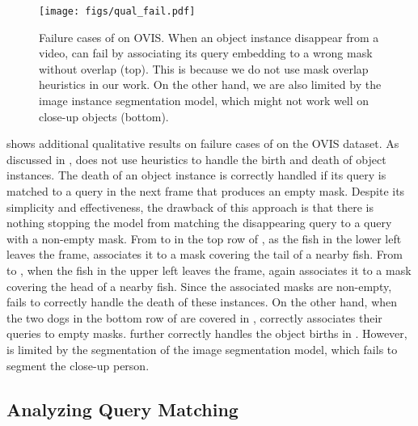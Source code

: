 \begin{figure}
  \centering
  \texttt{[image: figs/qual\_fail.pdf]}
  \caption{Failure cases of \ours on OVIS. When an object instance disappear from a video, \ours can fail by associating its query embedding to a wrong mask without overlap (top). This is because we do not use mask overlap heuristics in our work. On the other hand, we are also limited by the image instance segmentation model, which might not work well on close-up objects (bottom). }
  \label{fig:qual-fail}
\end{figure}


 shows additional qualitative results on failure cases of \ours on the OVIS dataset. As discussed in , \ours does not use heuristics to handle the birth and death of object instances. The death of an object instance is correctly handled if its query is matched to a query in the next frame that produces an empty mask. Despite its simplicity and effectiveness, the drawback of this approach is that there is nothing stopping the model from matching the disappearing query to a query with a non-empty mask. From  to  in the top row of , as the fish in the lower left leaves the frame, \ours associates it to a mask covering the tail of a nearby fish. From  to , when the fish in the upper left leaves the frame, \ours again associates it to a mask covering the head of a nearby fish. Since the associated masks are non-empty, \ours fails to correctly handle the death of these instances. On the other hand, when the two dogs in the bottom row of  are covered in , \ours correctly associates their queries to empty masks. \ours further correctly handles the object births in . However, \ours is limited by the segmentation of the image segmentation model, which fails to segment the close-up person.


\subsection{Analyzing Query Matching}
\label{sec:analysis}


